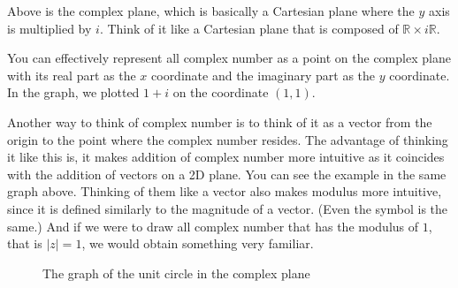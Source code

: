 \documentclass[12pt]{book}
\newcommand{\R}{\mathbb{R}}
\newcommand{\abso}[1]{\left|#1 \right|}
\begin{document}
Above is the complex plane, which is basically a Cartesian plane where the $y$ axis is multiplied by $i$. Think of it like a Cartesian plane that is composed of $\R \times i\R$.

You can effectively represent all complex number as a point on the complex plane with its real part as the $x$ coordinate and the imaginary part as the $y$ coordinate. In the graph, we plotted $1+i$ on the coordinate $(1,1)$.

Another way to think of complex number is to think of it as a vector from the origin to the point where the complex number resides. The advantage of thinking it like this is, it makes addition of complex number more intuitive as it coincides with the addition of vectors on a 2D plane. You can see the example in the same graph above. 
\newpage
Thinking of them like a vector also makes modulus more intuitive, since it is defined similarly to the magnitude of a vector. (Even the symbol is the same.) And if we were to draw all complex number that has the modulus of $1$, that is $\abso{z} = 1$, we would obtain something very familiar.

\begin{figure}[!h]
    \centering
    \caption{The graph of the unit circle in the complex plane}
    \label{fig:1.2}
\end{figure}
\end{document}
